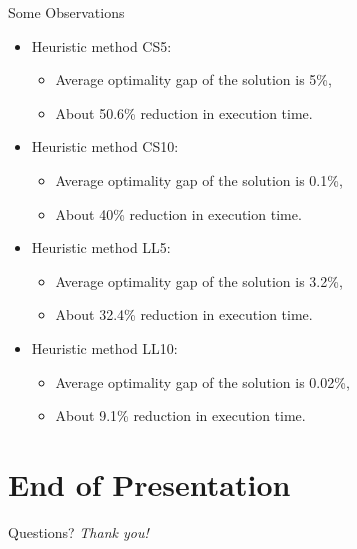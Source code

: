 \documentclass[xcolor=dvipsnames, mathserif, 10pt]{beamer}
\begin{document}
\begin{frame}{Some Observations}
\begin{itemize}
    \item Heuristic method CS5: 
    \begin{itemize}
        \item Average optimality gap of the solution is 5\%,
        \item About 50.6\% reduction in execution time.
    \end{itemize} 
    \item Heuristic method CS10: 
    \begin{itemize}
        \item Average optimality gap of the solution is 0.1\%,
        \item About 40\% reduction in execution time.
    \end{itemize}
    \item Heuristic method LL5:
    \begin{itemize}
        \item Average optimality gap of the solution is 3.2\%,
        \item About 32.4\% reduction in execution time.
    \end{itemize} 
    \item Heuristic method LL10: 
    
    \begin{itemize}
        \item Average optimality gap of the solution is 0.02\%,
        \item About 9.1\% reduction in execution time.
    \end{itemize} 
\end{itemize}

\end{frame}



\section*{End of Presentation}
\begin{frame}[noframenumbering]{Questions?}
\centering \LARGE
  \emph{Thank you!}
\end{frame}
\end{document}
